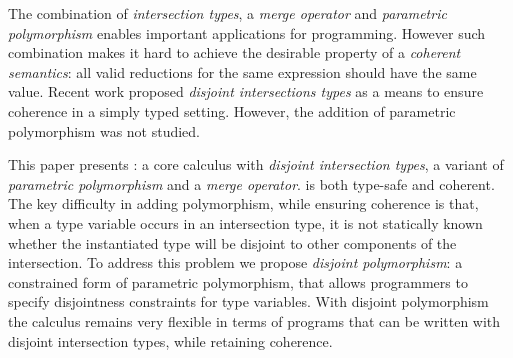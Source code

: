 The combination of \emph{intersection types}, a \emph{merge operator} 
and \emph{parametric polymorphism} enables
important applications for programming. However such combination makes
it hard to achieve the desirable property of a \emph{coherent
semantics}: all valid reductions for the same expression should
have the same value. Recent work proposed \emph{disjoint
intersections types} as a means to ensure coherence in a simply typed
setting. However, the addition of parametric polymorphism was not
studied.

This paper presents \name: a core calculus with 
\emph{disjoint intersection types}, a variant of \emph{parametric polymorphism} and a
\emph{merge operator}. \name is both type-safe and
coherent. The key difficulty in adding polymorphism, while ensuring
coherence is that, when a type variable occurs in an intersection
type, it is not statically known whether the instantiated type will be
disjoint to other components of the intersection. To address this
problem we propose \emph{disjoint polymorphism}: a constrained form of
parametric polymorphism, that allows programmers to specify
disjointness constraints for type variables. With disjoint
polymorphism the calculus remains very flexible in terms of programs
that can be written with disjoint intersection types, while retaining
coherence.

\begin{comment}
Coherence is achieved by ensuring that intersection types
are \emph{disjoint}. The approach works in the presence of parametric
polymorphism. However, parametric polymorphism makes the problem of coherence
significantly harder. When a type variable occurs in an intersection
type, it is not statically known whether the instantiated type will
be disjoint to other components of the intersection.
To address this problem we propose \emph{disjoint polymorphism}: a
constrained form of parametric polymorphism, that allows programmers
to specify disjointness constraints for type variables. With disjoint
polymorphism the calculus remains very flexible in terms of programs
that can be written with intersection types, while retaining coherence.
\end{comment}
